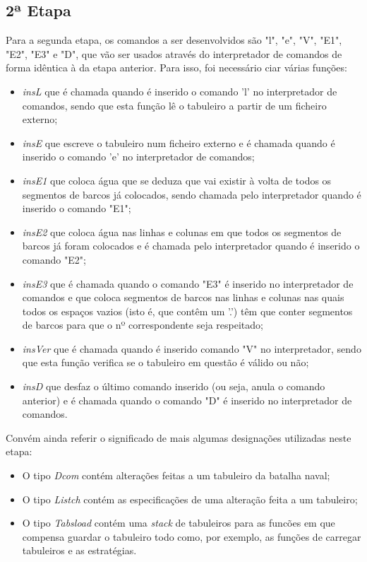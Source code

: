 \documentclass[12pt,a4paper,portuges]{article}
\begin{document}
\newpage

\subsection{\textbf{2ª Etapa}}

Para a segunda etapa, os comandos a ser desenvolvidos são "l", "e", "V", "E1", "E2", "E3" e "D", que vão ser usados através do interpretador de comandos de forma idêntica à da etapa anterior. Para isso, foi necessário ciar várias funções:
\begin{itemize}
\item \textit{insL} que é chamada quando é inserido o comando 'l' no interpretador de comandos, sendo que esta função lê o tabuleiro a partir de um ficheiro externo;
\item \textit{insE} que escreve o tabuleiro num ficheiro externo e é chamada quando é inserido o comando 'e' no interpretador de comandos;
\item \textit{insE1} que coloca água que se deduza que vai existir à volta de todos os segmentos de barcos já colocados, sendo chamada pelo interpretador quando é inserido o comando "E1";
\item \textit{insE2} que coloca água nas linhas e colunas em que todos os segmentos de barcos já foram colocados e é chamada pelo interpretador quando é inserido o comando "E2";
\item \textit{insE3} que é chamada quando o comando "E3" é inserido no interpretador de comandos e que coloca segmentos de barcos nas linhas e colunas nas quais todos os espaços vazios (isto é, que contêm um '.') têm que conter segmentos de barcos para que o nº correspondente seja respeitado;
\item \textit{insVer} que é chamada quando é inserido comando "V" no interpretador, sendo que esta função verifica se o tabuleiro em questão é válido ou não;
\item \textit{insD} que desfaz o último comando inserido (ou seja, anula o comando anterior) e é chamada quando o comando "D" é inserido no interpretador de comandos.
\end{itemize}

Convém ainda referir o significado de mais algumas designações utilizadas neste etapa:
\begin{itemize}
\item O tipo \textit{Dcom} contém alterações feitas a um tabuleiro da batalha naval;
\item O tipo \textit{Listch} contém as especificações de uma alteração feita a um tabuleiro;
\item O tipo \textit{Tabsload} contém uma \textit{stack} de tabuleiros para as funcões em que compensa guardar o tabuleiro todo como, por exemplo, as funções de carregar tabuleiros e as estratégias.
\end{itemize}
\end{document}
